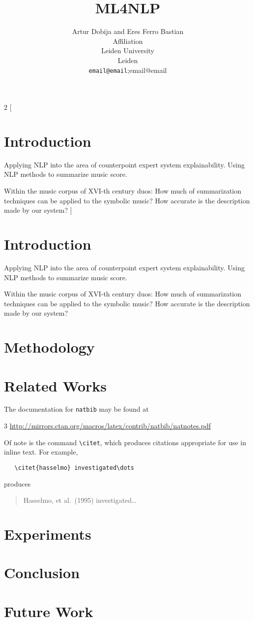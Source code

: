 \documentclass{article}
\title{ML4NLP}
\author{
  Artur Dobija and Eres Ferro Bastian \\
  Affiliation \\
  Leiden University \\
  Leiden \\
  \texttt{email@email};{email@email} \\
}
\begin{document}
\maketitle

\begin{abstract}
\lipsum[1]
\end{abstract}

\begin{multicols}{2}
[
    \section{Introduction}
    Applying NLP into the area of counterpoint expert system explainability. Using NLP methods to summarize music score.
    
    Within the music corpus of XVI-th century duos:
    How much of summarization techniques can be applied to the symbolic music? How accurate is the description made by our system?
]
\end{multicols}



\section{Introduction}

Applying NLP into the area of counterpoint expert system explainability.
Using NLP methods to summarize music score.

Within the music corpus of XVI-th century duos:
How much of summarization techniques can be applied to the symbolic music?
How accurate is the description made by our system?

\section{Methodology}

\section{Related Works}
\label{sec:others}

The documentation for \verb+natbib+ may be found at
\begin{center}{3}
  \url{http://mirrors.ctan.org/macros/latex/contrib/natbib/natnotes.pdf}
\end{center}
Of note is the command \verb+\citet+, which produces citations
appropriate for use in inline text.  For example,
\begin{verbatim}
   \citet{hasselmo} investigated\dots
\end{verbatim}
produces
\begin{quote}
  Hasselmo, et al.\ (1995) investigated\dots
\end{quote}

\section{Experiments}

\section{Conclusion}

\section{Future Work}

  

\end{document}
